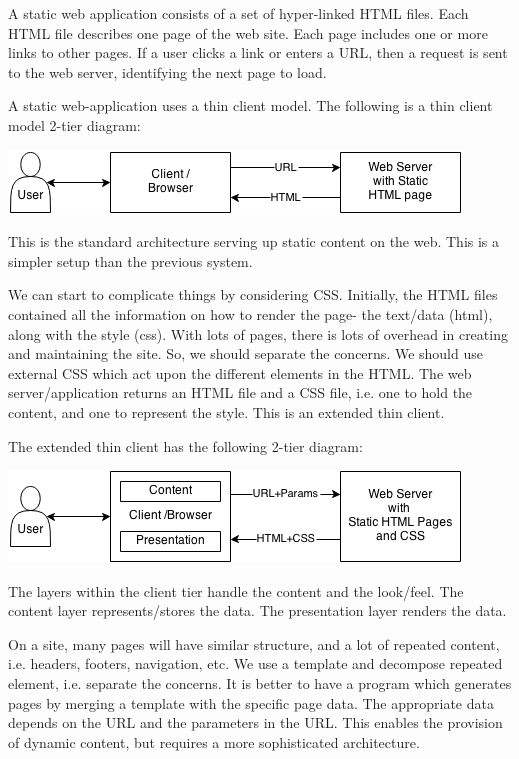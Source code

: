 \documentclass[a4paper, openany]{memoir}
\begin{document}
A static web application consists of a set of hyper-linked HTML files. Each HTML file describes one page of the web site. Each page includes one or more links to other pages. If a user clicks a link or enters a URL, then a request is sent to the web server, identifying the next page to load.

A static web-application uses a thin client model. The following is a thin client model 2-tier diagram:
\begin{center}
    \includegraphics[scale=0.8]{src/L7I3.png}
\end{center}
This is the standard architecture serving up static content on the web. This is a simpler setup than the previous system.

We can start to complicate things by considering CSS. Initially, the HTML files contained all the information on how to render the page- the text/data (html), along with the style (css). With lots of pages, there is lots of overhead in creating and maintaining the site. So, we should separate the concerns. We should use external CSS which act upon the different elements in the HTML. The web server/application returns an HTML file and a CSS file, i.e. one to hold the content, and one to represent the style. This is an extended thin client.

The extended thin client has the following 2-tier diagram:
\begin{center}
    \includegraphics[scale=0.8]{src/L7I4.png}
\end{center}
The layers within the client tier handle the content and the look/feel. The content layer represents/stores the data. The presentation layer renders the data.

On a site, many pages will have similar structure, and a lot of repeated content, i.e. headers, footers, navigation, etc. We use a template and decompose repeated element, i.e. separate the concerns. It is better to have a program which generates pages by merging a template with the specific page data. The appropriate data depends on the URL and the parameters in the URL. This enables the provision of dynamic content, but requires a more sophisticated architecture.
\end{document}

